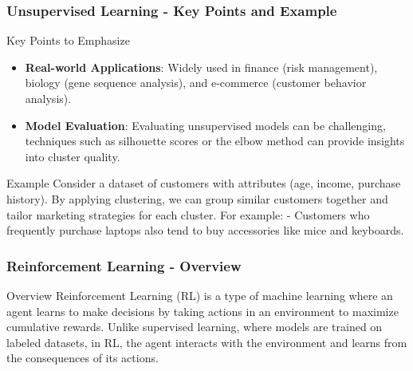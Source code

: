 \documentclass[aspectratio=169]{beamer}
\begin{document}
\begin{frame}[fragile]
  \frametitle{Unsupervised Learning - Key Points and Example}
  \begin{block}{Key Points to Emphasize}
    \begin{itemize}
      \item \textbf{Real-world Applications}: Widely used in finance (risk management), biology (gene sequence analysis), and e-commerce (customer behavior analysis).
      \item \textbf{Model Evaluation}: Evaluating unsupervised models can be challenging, techniques such as silhouette scores or the elbow method can provide insights into cluster quality.
    \end{itemize}
  \end{block}

  \begin{block}{Example}
    Consider a dataset of customers with attributes (age, income, purchase history). By applying clustering, we can group similar customers together and tailor marketing strategies for each cluster. For example:
    - Customers who frequently purchase laptops also tend to buy accessories like mice and keyboards.
  \end{block}
\end{frame}

\begin{frame}[fragile]
    \frametitle{Reinforcement Learning - Overview}
    \begin{block}{Overview}
        Reinforcement Learning (RL) is a type of machine learning 
        where an agent learns to make decisions by taking actions 
        in an environment to maximize cumulative rewards. Unlike 
        supervised learning, where models are trained on labeled 
        datasets, in RL, the agent interacts with the environment 
        and learns from the consequences of its actions.
    \end{block}
\end{frame}
\end{document}
